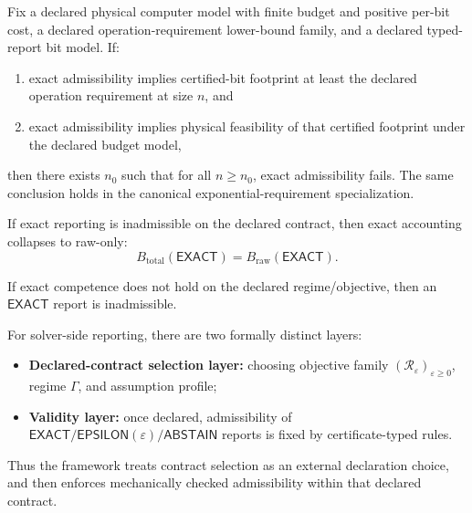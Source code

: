 \begin{corollary}\label{cor:finite-budget-no-exact-admissibility}
Fix a declared physical computer model with finite budget and positive per-bit cost, a declared operation-requirement lower-bound family, and a declared typed-report bit model.
If:
\begin{enumerate}
\item exact admissibility implies certified-bit footprint at least the declared operation requirement at size \(n\), and
\item exact admissibility implies physical feasibility of that certified footprint under the declared budget model,
\end{enumerate}
then there exists \(n_0\) such that for all \(n \ge n_0\), exact admissibility fails.
The same conclusion holds in the canonical exponential-requirement specialization.
\end{corollary}

\begin{corollary}\label{cor:hardness-raw-only-exact}
If exact reporting is inadmissible on the declared contract, then exact accounting collapses to raw-only:
\[
B_{\mathrm{total}}(\mathsf{EXACT})=B_{\mathrm{raw}}(\mathsf{EXACT}).
\]
\end{corollary}

\begin{corollary}\label{cor:no-uncertified-exact-claim}
If exact competence does not hold on the declared regime/objective, then an $\mathsf{EXACT}$ report is inadmissible.
\end{corollary}

\begin{proposition}\label{prop:declared-contract-selection-validity}
For solver-side reporting, there are two formally distinct layers:
\begin{itemize}
\item \textbf{Declared-contract selection layer:} choosing objective family $(\mathcal{R}_\varepsilon)_{\varepsilon\ge 0}$, regime $\Gamma$, and assumption profile;
\item \textbf{Validity layer:} once declared, admissibility of $\mathsf{EXACT}/\mathsf{EPSILON}(\varepsilon)/\mathsf{ABSTAIN}$ reports is fixed by certificate-typed rules.
\end{itemize}
Thus the framework treats contract selection as an external declaration choice, and then enforces mechanically checked admissibility within that declared contract.
\end{proposition}

